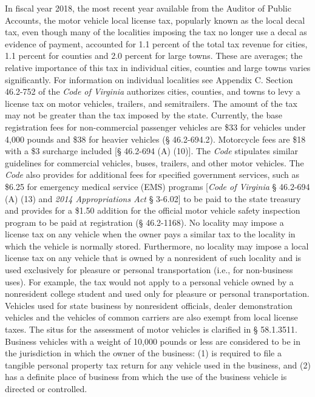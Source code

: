 \documentclass[
]{book}
\begin{document}
In fiscal year 2018, the most recent year available from the Auditor of Public Accounts, the motor vehicle local license tax, popularly known as the local decal tax, even though many of the localities imposing the tax no longer use a decal as evidence of payment, accounted for 1.1 percent of the total tax revenue for cities, 1.1 percent for counties and 2.0 percent for large towns. These are averages; the relative importance of this tax in individual cities, counties and large towns varies significantly. For information on individual localities see Appendix C.
\textbar{}
\textbar{} Section 46.2-752 of the \emph{Code of Virginia} authorizes cities, counties, and towns to levy a license tax on motor vehicles, trailers, and semitrailers. The amount of the tax may not be greater than the tax imposed by the state. Currently, the base registration fees for non-commercial passenger vehicles are \$33 for vehicles under 4,000 pounds and \$38 for heavier vehicles (§ 46.2-694.2). Motorcycle fees are \$18 with a \$3 surcharge included {[}§ 46.2-694 (A) (10){]}. The \emph{Code} stipulates similar guidelines for commercial vehicles, buses, trailers, and other motor vehicles. The \emph{Code} also provides for additional fees for specified government services, such as \$6.25 for emergency medical service (EMS) programs {[}\emph{Code of Virginia} § 46.2-694 (A) (13) and \emph{2014 Appropriations Act} § 3-6.02{]} to be paid to the state treasury and provides for a \$1.50 addition for the official motor vehicle safety inspection program to be paid at registration (§ 46.2-1168).
\textbar{}
\textbar{} No locality may impose a license tax on any vehicle when the owner pays a similar tax to the locality in which the vehicle is normally stored. Furthermore, no locality may impose a local license tax on any vehicle that is owned by a nonresident of such locality and is used exclusively for pleasure or personal transportation (i.e., for non-business uses). For example, the tax would not apply to a personal vehicle owned by a nonresident college student and used only for pleasure or personal transportation. Vehicles used for state business by nonresident officials, dealer demonstration vehicles and the vehicles of common carriers are also exempt from local license taxes.
\textbar{}
\textbar{} The situs for the assessment of motor vehicles is clarified in § 58.1.3511. Business vehicles with a weight of 10,000 pounds or less are considered to be in the jurisdiction in which the owner of the business: (1) is required to file a tangible personal property tax return for any vehicle used in the business, and (2) has a definite place of business from which the use of the business vehicle is directed or controlled.
\end{document}
